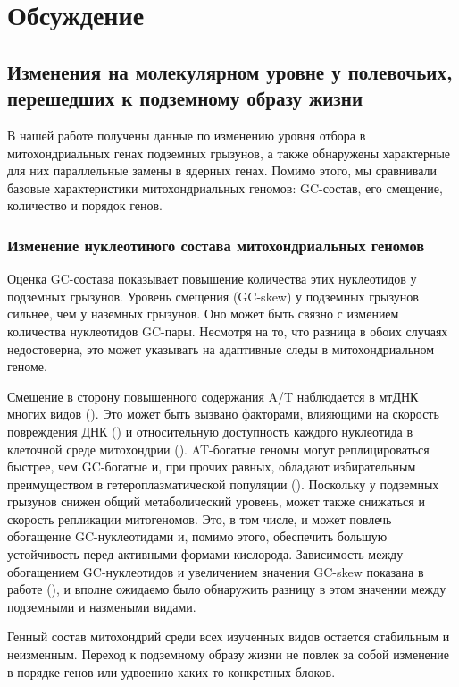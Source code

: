 \chapter{Обсуждение} \label{discussion}

\section{Изменения на молекулярном уровне у полевочьих, перешедших к подземному образу жизни}

В нашей работе получены данные по изменению уровня отбора в митохондриальных генах подземных грызунов, а также обнаружены характерные для них параллельные замены в ядерных генах. Помимо этого, мы сравнивали базовые характеристики митохондриальных геномов: GC-состав, его смещение, количество и порядок генов. 

\subsection{Изменение нуклеотиного состава митохондриальных геномов}

Оценка GC-состава показывает повышение количества этих нуклеотидов у подземных грызунов. Уровень смещения (GC-skew) у подземных грызунов сильнее, чем у наземных грызунов. Оно может быть связно с измением количества нуклеотидов GC-пары. Несмотря на то, что разница в обоих случаях недостоверна, это может указывать на адаптивные следы в митохондриальном геноме. 

Смещение в сторону повышенного содержания A/T наблюдается в мтДНК многих видов (\cite{Ballard2004}). Это может быть вызвано факторами, влияющими на скорость повреждения ДНК (\cite{Martin1995}) и относительную доступность каждого нуклеотида в клеточной среде митохондрии (\cite{Xia1996}). AT-богатые геномы могут реплицироваться быстрее, чем GC-богатые и, при прочих равных, обладают избирательным преимуществом в гетероплазматической популяции (\cite{Ballard2000}). Поскольку у подземных грызунов снижен общий метаболический уровень, может также снижаться и скорость репликации митогеномов. Это, в том числе, и может повлечь обогащение GC-нуклеотидами и, помимо этого, обеспечить большую устойчивость перед активными формами кислорода. Зависимость между обогащением GC-нуклеотидов и увеличением значения GC-skew показана в работе (\cite{Saccone2000}), и вполне ожидаемо было обнаружить разницу в этом значении между подземными и назмеными видами. 

Генный состав митохондрий среди всех изученных видов остается стабильным и неизменным. Переход к подземному образу жизни не повлек за собой изменение в порядке генов или удвоению каких-то конкретных блоков. 

